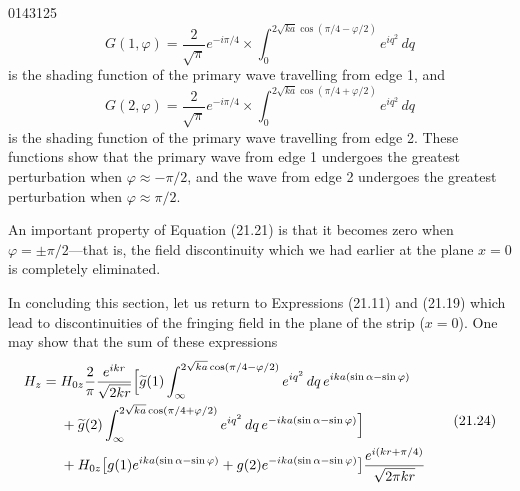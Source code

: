 \begin{scanpage}{0143}{125}
\[
G(1,\varphi)=\frac2{\sqrt\pi}e^{-i\pi/4}\times\int_0^{2\sqrt{ka}\cos(\pi/4-\varphi/2)}e^{iq^2}\,dq\tag{21.22}
\]
is the shading function of the primary wave travelling from edge 1, and
\[
G(2,\varphi)=\frac2{\sqrt\pi}e^{-i\pi/4}\times\int_0^{2\sqrt{ka}\cos(\pi/4+\varphi/2)}e^{iq^2}\,dq\tag{21.23}
\]
is the shading function of the primary wave travelling from edge 2. These functions show that the primary wave from edge 1 undergoes the greatest perturbation when $\varphi\approx-\pi/2$, and the wave from edge 2 undergoes the greatest perturbation when $\varphi\approx\pi/2$.

An important property of Equation (21.21) is that it becomes zero when $\varphi=\pm\pi/2$---that is, the field discontinuity which we had earlier at the plane $x=0$ is completely eliminated.

In concluding this section, let us return to Expressions (21.11) and (21.19) which lead to discontinuities of the fringing field in the plane of the strip ($x=0$). One may show that the sum of these expressions
\[
\begin{aligned}
H_z={}&H_{0z}\frac2\pi\frac{e^{ikr}}{\sqrt{2kr}}\Bigl[\widetilde g(1)\int_\infty^{2\sqrt{ka}\cos(\pi/4-\varphi/2)}e^{iq^2}\,dq\,e^{ika(\sin\alpha-\sin\varphi)}\\
&+\widetilde g(2)\int_\infty^{2\sqrt{ka}\cos(\pi/4+\varphi/2)}e^{iq^2}\,dq\,e^{-ika(\sin\alpha-\sin\varphi)}\Bigr]\\
&+H_{0z}\bigl[g(1)e^{ika(\sin\alpha-\sin\varphi)}+g(2)e^{-ika(\sin\alpha-\sin\varphi)}\bigr]\frac{e^{i(kr+\pi/4)}}{\sqrt{2\pi kr}}
\end{aligned}\tag{21.24}
\]
\end{scanpage}
